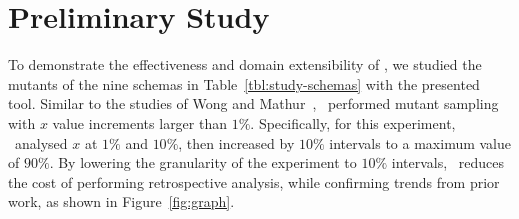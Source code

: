 \section{Preliminary Study}

To demonstrate the effectiveness and domain extensibility of \mrstudyr, we studied the mutants of the nine schemas in
Table~\ref{tbl:study-schemas} with the presented tool. Similar to the studies of Wong and
Mathur~\cite{mathur1994empirical}, \mr~performed mutant sampling with $x$ value increments larger than $1\%$.
Specifically, for this experiment, \mr~analysed $x$ at $1\%$ and $10\%$, then increased by $10\%$ intervals to a maximum
value of $90\%$. By lowering the granularity of the experiment to $10\%$ intervals, \mr~reduces the cost of performing
retrospective analysis, while confirming trends from prior work, as shown in Figure~\ref{fig:graph}.








